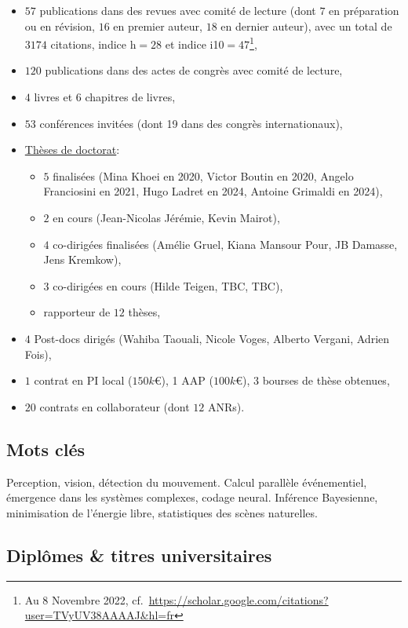 \documentclass[10pt,french,a4paper,oneside]{article}%
\begin{document}
\begin{itemize}

\item	$57$ publications dans des revues avec comité de lecture (dont $7$ en préparation ou en révision, $16$ en premier auteur, $18$ en dernier auteur), avec un total de $3174$ citations, indice h$=28$ et  indice i10$=47$\footnote{Au 8 Novembre 2022, cf.~\url{https://scholar.google.com/citations?user=TVyUV38AAAAJ&hl=fr}},
\item	$120$ publications dans des actes de congrès avec comité de lecture,
\item	$4$ livres et $6$ chapitres de livres,
\item	$53$ conférences invitées (dont 19 dans des congrès internationaux),
\item \href{https://www.theses.fr/074493701}{Thèses de doctorat}:
\begin{itemize}
	\item $5$ finalisées (Mina Khoei en 2020, Victor Boutin en 2020, Angelo Franciosini en 2021, Hugo Ladret en 2024, Antoine Grimaldi en 2024),
	\item $2$ en cours (Jean-Nicolas Jérémie, Kevin Mairot), 
	\item $4$ co-dirigées finalisées  (Amélie Gruel, Kiana Mansour Pour, JB Damasse, Jens Kremkow),
	\item $3$ co-dirigées en cours (Hilde Teigen, TBC, TBC),
	\item rapporteur de $12$ thèses,
\end{itemize} %
\item $4$ Post-docs dirigés (Wahiba Taouali, Nicole Voges, Alberto Vergani, Adrien Fois),
\item $1$ contrat en PI local ($150 k$\euro{}), 1 AAP ($100 k$\euro{}), $3$ bourses de thèse obtenues,
\item $20$ contrats en collaborateur (dont $12$ ANRs).

\end{itemize} %

\subsection*{Mots clés}
Perception, vision, détection du mouvement. Calcul parallèle événementiel, émergence dans les systèmes complexes, codage neural. Inférence Bayesienne, minimisation de l'énergie libre, statistiques des scènes naturelles.

\subsection{Diplômes \& titres universitaires}
\end{document}
